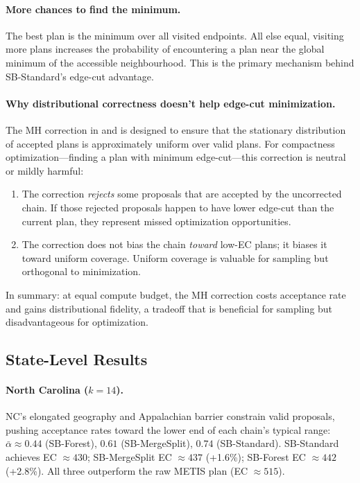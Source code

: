 \paragraph{More chances to find the minimum.}
The best plan is the minimum over all visited endpoints.
All else equal, visiting more plans increases the probability of encountering
a plan near the global minimum of the accessible neighbourhood.
This is the primary mechanism behind SB-Standard's edge-cut advantage.

\paragraph{Why distributional correctness doesn't help edge-cut minimization.}
The MH correction in \frecom{} and \ms{} is designed to ensure that the
stationary distribution of accepted plans is approximately uniform over
valid plans.
For compactness optimization---finding a plan with minimum edge-cut---this
correction is neutral or mildly harmful:
\begin{enumerate}
  \item The correction \emph{rejects} some proposals that are accepted by
        the uncorrected \recom{} chain.
        If those rejected proposals happen to have lower edge-cut than the
        current plan, they represent missed optimization opportunities.
  \item The correction does not bias the chain \emph{toward} low-EC plans;
        it biases it toward uniform coverage.
        Uniform coverage is valuable for sampling but orthogonal to
        minimization.
\end{enumerate}
In summary: at equal compute budget, the MH correction costs acceptance
rate and gains distributional fidelity, a tradeoff that is beneficial for
sampling but disadvantageous for optimization.

\subsection{State-Level Results}

\paragraph{North Carolina ($k=14$).}
NC's elongated geography and Appalachian barrier constrain valid proposals,
pushing acceptance rates toward the lower end of each chain's typical range:
$\bar\alpha \approx 0.44$ (SB-Forest), $0.61$ (SB-MergeSplit), $0.74$
(SB-Standard).
SB-Standard achieves EC $\approx 430$; SB-MergeSplit EC $\approx 437$ (+1.6\%);
SB-Forest EC $\approx 442$ (+2.8\%).
All three outperform the raw METIS plan (EC $\approx 515$).

